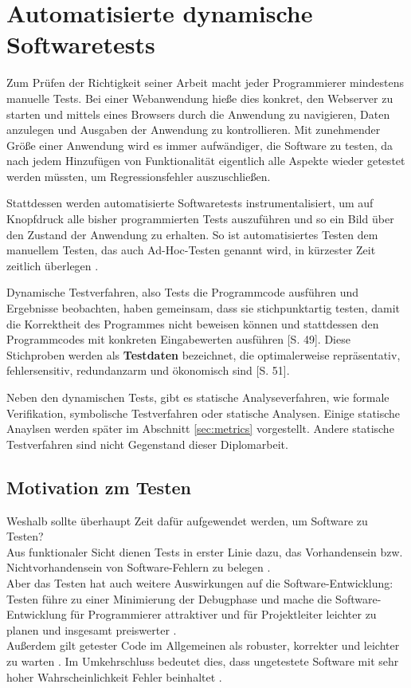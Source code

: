 \section{Automatisierte dynamische Softwaretests}

Zum Prüfen der Richtigkeit seiner Arbeit macht jeder Programmierer mindestens manuelle Tests. Bei einer Webanwendung hieße dies konkret, den Webserver zu starten und mittels eines Browsers durch die Anwendung zu navigieren, Daten anzulegen und Ausgaben der Anwendung zu kontrollieren. Mit zunehmender Größe einer Anwendung wird es immer aufwändiger, die Software zu testen, da nach jedem Hinzufügen von Funktionalität eigentlich alle Aspekte wieder getestet werden müssten, um Regressionsfehler auszuschließen.

Stattdessen werden automatisierte Softwaretests instrumentalisiert, um auf Knopfdruck alle bisher programmierten Tests auszuführen und so ein Bild über den Zustand der Anwendung zu erhalten. So ist automatisiertes Testen dem manuellem Testen, das auch Ad-Hoc-Testen genannt wird, in kürzester Zeit zeitlich überlegen \citep{rappin_rails_2011}.

Dynamische Testverfahren, also Tests die Programmcode ausführen und Ergebnisse beobachten, haben gemeinsam, dass sie stichpunktartig testen, damit die Korrektheit des Programmes nicht beweisen können und stattdessen den Programmcodes mit konkreten Eingabewerten ausführen \cite{liggesmeyer_modultest_1990}[S. 49]. Diese Stichproben werden als \textbf{Testdaten} bezeichnet, die optimalerweise repräsentativ, fehlersensitiv, redundanzarm und ökonomisch sind \citep{liggesmeyer_modultest_1990}[S. 51].

Neben den dynamischen Tests, gibt es statische Analyseverfahren, wie formale Verifikation, symbolische Testverfahren oder statische Analysen. Einige statische Anaylsen werden später im Abschnitt \ref{sec:metrics} vorgestellt. Andere statische Testverfahren sind nicht Gegenstand dieser Diplomarbeit.

\subsection{Motivation zm Testen}
Weshalb sollte überhaupt Zeit dafür aufgewendet werden, um Software zu Testen?\\
Aus funktionaler Sicht dienen Tests in erster Linie dazu, das Vorhandensein bzw. Nichtvorhandensein von Software-Fehlern zu belegen \citep{goodliffe_code_2006}.\\
Aber das Testen hat auch weitere Auswirkungen auf die Software-Entwicklung: Testen führe zu einer Minimierung der Debugphase und mache die Software-Entwicklung für Programmierer attraktiver und für Projektleiter leichter zu planen \citep{orsini_rails_2007} und insgesamt preiswerter \citep[S.13]{liggesmeyer_modultest_1990}.\\
Außerdem gilt getester Code im Allgemeinen als robuster, korrekter und leichter zu warten \citep{rappin_rails_2011}. Im Umkehrschluss bedeutet dies, dass ungetestete Software mit sehr hoher Wahrscheinlichkeit Fehler beinhaltet \citep{goodliffe_code_2006}.

